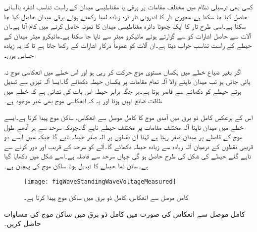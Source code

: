 کسی بھی ترسیلی نظام میں مختلف مقامات پر برقی یا مقناطیسی میدان کے راست تناسب اشارہ  باآسانی حاصل کیا جا سکتا ہے۔محوری تار کا اندرونی تار ذرہ زیادہ لمبا رکھتے ہوئے برقی میدان حاصل کیا جا سکتا ہے۔اسی  طرح تار کا ایک چھوٹا دائرہ مقناطیسی میدان کا نمونہ حاصل کرنے میں کام آتا ہے۔ان آلات سے حاصل اشارات کو  سے گزارتے ہوئے مائیکرو میٹر سے ناپا جا سکتا ہے۔مائیکرو میٹر میدان کے حیطے کے راست تناسب جواب دیتا ہے۔ان آلات کو عموماً درکار اشارات کے  رکھا جاتا ہے تا کہ یہ زیادہ حساس ہوں۔

اگر بغیر ضیاع خطے میں یکساں مستوی موج حرکت کر رہی ہو اور اس خطے میں انعکاسی موج نہ پائی جاتی ہو تب میدان ناپنے والا آلہ تمام مقامات پر یکساں حیطہ دکھائے گا۔ایسا آلہ تیزی سے تبدیل ہوتے حیطے کو دکھانے سے قاصر ہوتا ہے۔ہر جگہ برابر حیطہ اس بات کی نشانی ہے کہ خطے میں طاقت ضائع نہیں ہوتا اور یہ کہ انعکاسی موج بھی غیر موجود ہے۔

اس کے برعکس کامل ذو برق میں آمدی موج کا کامل موصل سے انعکاس، ساکن موج پیدا کرتا ہے۔ایسے خطے میں میدان ناپتا آلہ مختلف مقامات پر مختلف حیطے ناپے گا۔چونکہ سرحد سے ہر آدھے طول موج کے فاصلے پر میدان صفر رہتا ہے لہٰذا ان نقطوں پر آلہ صفر حیطہ ناپے گا جبکہ عین ایسے دو قریبی نقطوں کے درمیان آلہ زیادہ سے زیادہ حیطہ دکھائے گا۔آلے کو سرحد کے قریب اور دور کرنے سے ناپے گئے حیطے کی شکل  کی طرح حاصل ہو گی جہاں سرحد سے فاصلہ  ہے۔اسے شکل  میں دکھایا گیا ہے۔سائن نما حیطے کا تبدیل ہونا ساکن موج کی پہچان ہے۔

\begin{figure}
\centering
\texttt{[image: figWaveStandingWaveVoltageMeasured]}
\caption{کامل موصل سے انعکاس، کامل ذو برق میں ساکن موج پیدا کرتا ہے۔}
\label{شکل_موج_ساکن_موج_شکل}
\end{figure}

کامل موصل سے انعکاس کی صورت میں کامل ذو برق میں ساکن موج کی مساوات حاصل کریں۔

